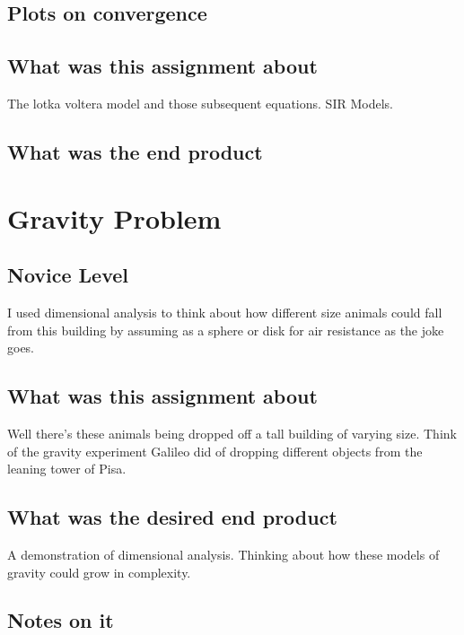 \subsection{Plots on convergence}




\subsection{What was this assignment about}
The lotka voltera model and those subsequent equations. SIR Models. 

\subsection{What was the end product}




\section{Gravity Problem}


\subsection{Novice Level}
I used dimensional analysis to think about how different size animals could fall from this building by assuming as a sphere or disk for air resistance as the joke goes. 


\subsection{What was this assignment about}
Well there's these animals being dropped off a tall building of varying size. Think of the gravity experiment Galileo did of dropping different objects from the leaning tower of Pisa. \\ 

\subsection{What was the desired end product}
A demonstration of dimensional analysis. Thinking about how these models of gravity could grow in complexity. 

\subsection{Notes on it}




